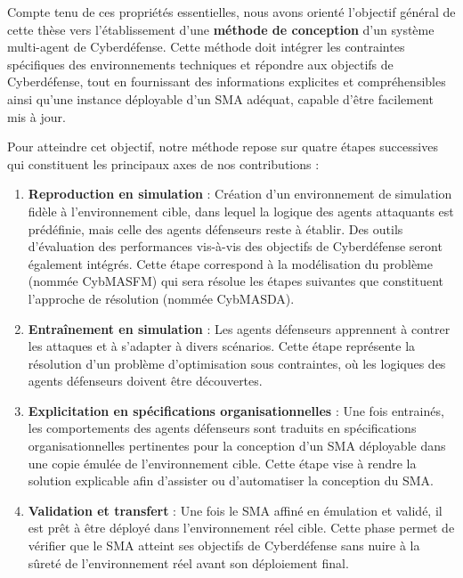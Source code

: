 Compte tenu de ces propriétés essentielles, nous avons orienté l'objectif général de cette thèse vers l'établissement d'une \textbf{méthode de conception} d'un système multi-agent de Cyberdéfense. Cette méthode doit intégrer les contraintes spécifiques des environnements techniques et répondre aux objectifs de Cyberdéfense, tout en fournissant des informations explicites et compréhensibles ainsi qu'une instance déployable d'un SMA adéquat, capable d'être facilement mis à jour.

Pour atteindre cet objectif, notre méthode repose sur quatre étapes successives qui constituent les principaux axes de nos contributions :

\begin{enumerate}
    \item \textbf{Reproduction en simulation} : Création d'un environnement de simulation fidèle à l'environnement cible, dans lequel la logique des agents attaquants est prédéfinie, mais celle des agents défenseurs reste à établir. Des outils d'évaluation des performances vis-à-vis des objectifs de Cyberdéfense seront également intégrés. Cette étape correspond à la modélisation du problème (nommée CybMASFM) qui sera résolue les étapes suivantes que constituent l'approche de résolution (nommée CybMASDA).
    
    \item \textbf{Entraînement en simulation} : Les agents défenseurs apprennent à contrer les attaques et à s'adapter à divers scénarios. Cette étape représente la résolution d'un problème d'optimisation sous contraintes, où les logiques des agents défenseurs doivent être découvertes.
    
    \item \textbf{Explicitation en spécifications organisationnelles} : Une fois entrainés, les comportements des agents défenseurs sont traduits en spécifications organisationnelles pertinentes pour la conception d'un SMA déployable dans une copie émulée de l'environnement cible. Cette étape vise à rendre la solution explicable afin d'assister ou d'automatiser la conception du SMA.
    
    \item \textbf{Validation et transfert} : Une fois le SMA affiné en émulation et validé, il est prêt à être déployé dans l'environnement réel cible. Cette phase permet de vérifier que le SMA atteint ses objectifs de Cyberdéfense sans nuire à la sûreté de l'environnement réel avant son déploiement final.
\end{enumerate}

